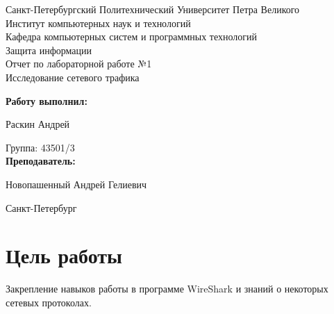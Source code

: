 \documentclass[a4paper, 14pt,russian]{article}
\begin{document}
\begin{titlepage} %

\begin{center} %

\large Санкт-Петербургский Политехнический Университет Петра Великого\\
\large Институт компьютерных наук и технологий \\
\large Кафедра компьютерных систем и программных технологий\\[6cm]

\huge Защита информации\\[0.5cm] %
\large Отчет по лабораторной работе №1\\[0.1cm]
\large Исследование сетевого трафика\\[5cm]
\end{center}

\begin{flushright}
\begin{minipage}{0.5\textwidth}
\begin{flushright}
\textbf{Работу выполнил:}

Раскин Андрей

{Группа:} 43501/3\\


\textbf{Преподаватель:} 

Новопашенный Андрей Гелиевич 
\end{flushright}
\end{minipage} %
\end{flushright} %

\vfill %

\begin{center}

\large Санкт-Петербург\\
\large \the\year %

\end{center} %

\thispagestyle{empty} %
\end{titlepage} %

\vfill %

\section{Цель работы}
Закрепление навыков работы в программе WireShark и знаний о некоторых сетевых протоколах. 
\end{document}
